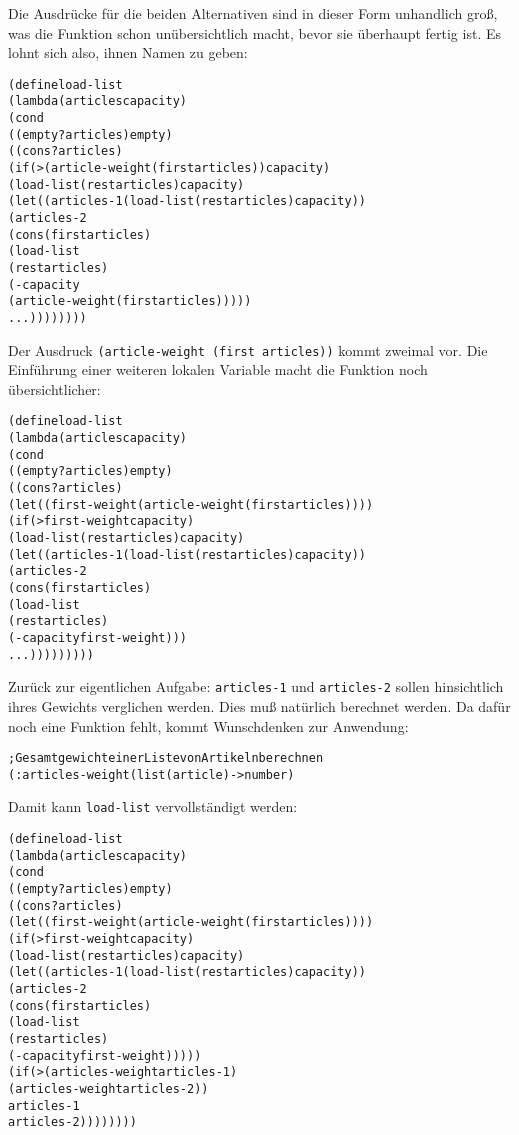 %
Die Ausdrücke für die beiden Alternativen sind in dieser Form 
unhandlich groß, was die Funktion schon unübersichtlich macht, bevor
sie überhaupt fertig ist.
Es lohnt sich also, ihnen Namen zu geben:
%
\begin{alltt}
(define load-list
  (lambda (articles capacity)
    (cond
     ((empty? articles) empty)
     ((cons? articles)
        (if (> (article-weight (first articles)) capacity)
            (load-list (rest articles) capacity)
            (let ((articles-1 (load-list (rest articles) capacity))
                  (articles-2
                    (cons (first articles)
                               (load-list
                                 (rest articles)
                                 (- capacity 
                                    (article-weight (first articles)))))
              ...))))))))
\end{alltt}
%
Der Ausdruck
\texttt{(article-weight (first articles))} kommt zweimal vor.  Die Einführung einer
weiteren lokalen Variable macht die Funktion noch übersichtlicher:
%
\begin{alltt}
(define load-list
  (lambda (articles capacity)
    (cond
     ((empty? articles) empty)
     ((cons? articles)
      (let ((first-weight (article-weight (first articles))))
        (if (> first-weight capacity)
            (load-list (rest articles) capacity)
            (let ((articles-1 (load-list (rest articles) capacity))
                  (articles-2
                    (cons (first articles)
                               (load-list
                                 (rest articles)
                                 (- capacity first-weight)))
              ...)))))))))
\end{alltt}
%
Zurück zur eigentlichen Aufgabe: \texttt{articles-1} und
\texttt{articles-2} sollen hinsichtlich ihres Gewichts verglichen werden.
Dies muß natürlich berechnet werden.  Da dafür noch eine Funktion
fehlt, kommt Wunschdenken zur Anwendung:
%
\begin{alltt}
; Gesamtgewicht einer Liste von Artikeln berechnen
(: articles-weight (list(article) -> number)
\end{alltt}
% 
Damit kann \texttt{load-list} vervollständigt werden:
%
\begin{alltt}
(define load-list
  (lambda (articles capacity)
    (cond
     ((empty? articles) empty)
     ((cons? articles)
      (let ((first-weight (article-weight (first articles))))
        (if (> first-weight capacity)
            (load-list (rest articles) capacity)
            (let ((articles-1 (load-list (rest articles) capacity))
                  (articles-2
                   (cons (first articles)
                              (load-list
                                (rest articles) 
                                (- capacity first-weight)))))
              (if (> (articles-weight articles-1)
                     (articles-weight articles-2))
                  articles-1
                  articles-2))))))))
\end{alltt}

